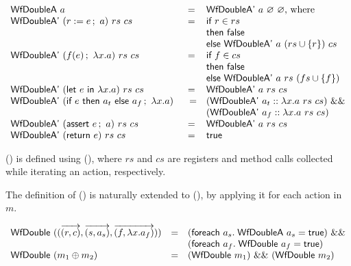 \begin{definition}
  \label{def-wfdoublea}
  \mbox{}
  \begin{center}
    \begin{math}
      \begin{array}{lcl}
        \wfdoublea{a} & = & \wfdoubleap{a}{\emptyset}{\emptyset} \textrm{, where} \\
        \wfdoubleap{(\actwrite{r}{e}{a})}{rs}{cs} & = & \wordif{} r \in rs \\
        & & \wordthen{} \bfalse{} \\
        & & \wordelse{} \wfdoubleap{a}{(\setadd{rs}{r})}{cs} \\
        \wfdoubleap{(\actcall{x}{f}{e}{a})}{rs}{cs} & = & \wordif{} f \in cs \\
        & & \wordthen{} \bfalse{} \\
        & & \wordelse{} \wfdoubleap{a}{rs}{(\setadd{fs}{f})} \\
        \wfdoubleap{(\actlet{e}{x}{a})}{rs}{cs} & = & \wfdoubleap{a}{rs}{cs} \\
        \wfdoubleap{(\actifelse{e}{a_t}{a_f}{x}{a})} & =
        & (\wfdoubleap{\concataction{a_t}{a}}{rs}{cs})\ \band{} \\
        & & (\wfdoubleap{\concataction{a_f}{a}}{rs}{cs}) \\
        \wfdoubleap{(\actassert{e}{a})}{rs}{cs} & = & \wfdoubleap{a}{rs}{cs} \\
        \wfdoubleap{(\actret{e})}{rs}{cs} & = & \btrue{} \\
      \end{array}
    \end{math}
  \end{center}
\end{definition}

() is defined using (), where $rs$
and $cs$ are registers and method calls collected while iterating an
action, respectively. 

The definition of () is naturally extended to
(), by applying it for each action in $m$.

\begin{definition}
  \label{def-wfdouble}
  \mbox{}
  \begin{center}
    \begin{math}
      \begin{array}{lcl}
        \wfdouble{(\modbasic{\regpair{r}{c}}{\rulepair{s}{a_s}}{\methodpair{f}{\lambda x.a_f}})} & =
        & (\wordforeach{} a_s.\; \wfdoublea{a_s} = \btrue)\ \band{} \\
        & & (\wordforeach{} a_f.\; \wfdouble{a_f} = \btrue) \\
        \wfdouble{(\modcomp{m_1}{m_2})} & = & (\wfdouble{m_1})\ \band{}\ (\wfdouble{m_2}) \\
      \end{array}
    \end{math}
  \end{center}
\end{definition}

